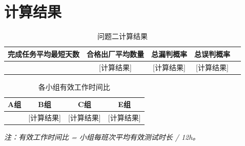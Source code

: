 \documentclass{article}
\begin{document}
\section{计算结果}

\begin{table}[H]
\centering
\caption{问题二计算结果}
\begin{tabular}{ccccc}
\toprule
完成任务平均最短天数 & 合格出厂平均数量 & 总漏判概率 & 总误判概率 \\
\midrule
[计算结果] & [计算结果] & [计算结果] & [计算结果] \\
\bottomrule
\end{tabular}
\end{table}

\begin{table}[H]
\centering
\caption{各小组有效工作时间比}
\begin{tabular}{cccc}
\toprule
A组 & B组 & C组 & E组 \\
\midrule
[计算结果] & [计算结果] & [计算结果] & [计算结果] \\
\bottomrule
\end{tabular}
\end{table}
\emph{注：有效工作时间比 = 小组每班次平均有效测试时长 / 12h。}
\end{document}
